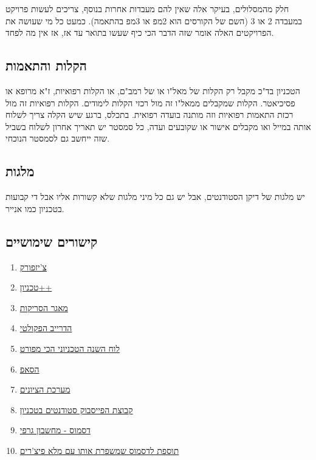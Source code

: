 \documentclass[a4paper,12pt]{article}
\begin{document}
חלק מהמסלולים, בעיקר אלה שאין להם מעבדות אחרות בנוסף, צריכים לעשות פרויקט במעבדה 2 או 3 (השם של הקורסים הוא 2מפ או 3מפ בהתאמה). כמעט כל מי שעושה את הפרויקטים האלה אומר שזה הדבר הכי כיף שעשו בתואר עד אז, אז אין מה לפחד.

\subsection{הקלות והתאמות}

הטכניון בד"כ מקבל רק הקלות של מאל"ו או של רמב"ם, או הקלות רפואיות, ז"א מרופא או פסיכיאטר. הקלות שמקבלים ממאל"ו זה מול רכזי הקלות לימודים. הקלות רפואיות זה מול רכזת התאמות רפואיות וזה מותנה בועדה רפואית. בתכלס, ברגע שיש הקלה צריך לשלוח אותה במייל ואו מקבלים אישור או שקובעים ועדה, כל סמסטר יש תאריך אחרון לשלוח בשביל שזה ייחשב גם לסמסטר הנוכחי.

\subsection{מלגות}

יש מלגות של דיקן הסטודנטים, אבל יש גם כל מיני מלגות שלא קשורות אליו אבל די קבועות בטכניון כמו אנייר.

\subsection{קישורים שימושיים}

\begin{enumerate}
    \item \href{https://cheesefork.cf/}{צ'יזפורק}
    \item \href{https://chromewebstore.google.com/detail/pfhjnidbfndnjhpcpfecngcigdjebemk}{טכניון++}
    \item \href{https://tscans.cf/}{מאגר הסריקות}
    \item \href{https://drive.google.com/drive/folders/1g5687tI9s-fwjgbp4C28qpOQerYVEQVp}{הדרייב הפקולטי}
    \item \href{https://www.admin.technion.ac.il/dpcalendar/}{לוח השנה הטכניוני הכי מפורט}
    \item \href{https://portalex.technion.ac.il/irj/portal/external}{הסאפ}
    \item \href{https://grades.technion.ac.il/index.aspx}{מערכת הציונים}
    \item \href{https://www.facebook.com/groups/118649778226975}{קבוצת הפייסבוק סטודנטים בטכניון}
    \item \href{https://www.desmos.com/}{דסמוס - מחשבון גרפי}
    \item \href{https://chromewebstore.google.com/detail/eclmfdfimjhkmjglgdldedokjaemjfjp}{תוספת לדסמוס שמשפרת אותו עם מלא פיצ'רים}
\end{enumerate}
\end{document}
